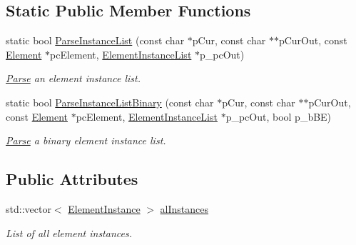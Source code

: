 \subsection*{Static Public Member Functions}
\begin{DoxyCompactItemize}
\item 
\hypertarget{class_assimp_1_1_p_l_y_1_1_element_instance_list_af78b9bbc92552fc5e6a84b9e2d202b77}{static bool \hyperlink{class_assimp_1_1_p_l_y_1_1_element_instance_list_af78b9bbc92552fc5e6a84b9e2d202b77}{Parse\+Instance\+List} (const char $\ast$p\+Cur, const char $\ast$$\ast$p\+Cur\+Out, const \hyperlink{class_assimp_1_1_p_l_y_1_1_element}{Element} $\ast$pc\+Element, \hyperlink{class_assimp_1_1_p_l_y_1_1_element_instance_list}{Element\+Instance\+List} $\ast$p\+\_\+pc\+Out)}\label{class_assimp_1_1_p_l_y_1_1_element_instance_list_af78b9bbc92552fc5e6a84b9e2d202b77}

\begin{DoxyCompactList}\small\item\em \hyperlink{struct_parse}{Parse} an element instance list. \end{DoxyCompactList}\item 
\hypertarget{class_assimp_1_1_p_l_y_1_1_element_instance_list_ae19f740435b4590627fc9eaa9ca2c0a0}{static bool \hyperlink{class_assimp_1_1_p_l_y_1_1_element_instance_list_ae19f740435b4590627fc9eaa9ca2c0a0}{Parse\+Instance\+List\+Binary} (const char $\ast$p\+Cur, const char $\ast$$\ast$p\+Cur\+Out, const \hyperlink{class_assimp_1_1_p_l_y_1_1_element}{Element} $\ast$pc\+Element, \hyperlink{class_assimp_1_1_p_l_y_1_1_element_instance_list}{Element\+Instance\+List} $\ast$p\+\_\+pc\+Out, bool p\+\_\+b\+B\+E)}\label{class_assimp_1_1_p_l_y_1_1_element_instance_list_ae19f740435b4590627fc9eaa9ca2c0a0}

\begin{DoxyCompactList}\small\item\em \hyperlink{struct_parse}{Parse} a binary element instance list. \end{DoxyCompactList}\end{DoxyCompactItemize}
\subsection*{Public Attributes}
\begin{DoxyCompactItemize}
\item 
\hypertarget{class_assimp_1_1_p_l_y_1_1_element_instance_list_a64a5cdc3a1bd4f054447480f0e09ea0a}{std\+::vector$<$ \hyperlink{class_assimp_1_1_p_l_y_1_1_element_instance}{Element\+Instance} $>$ \hyperlink{class_assimp_1_1_p_l_y_1_1_element_instance_list_a64a5cdc3a1bd4f054447480f0e09ea0a}{al\+Instances}}\label{class_assimp_1_1_p_l_y_1_1_element_instance_list_a64a5cdc3a1bd4f054447480f0e09ea0a}

\begin{DoxyCompactList}\small\item\em List of all element instances. \end{DoxyCompactList}\end{DoxyCompactItemize}


